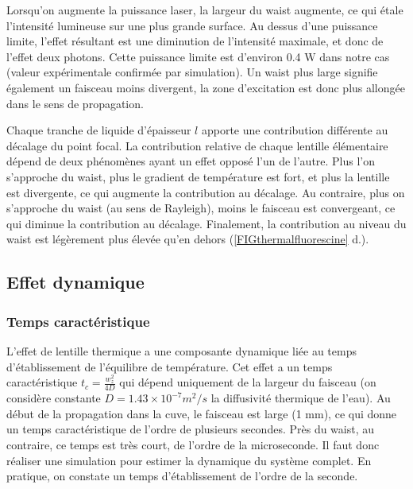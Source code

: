 Lorsqu'on augmente la puissance laser, la largeur du waist augmente, ce qui étale l'intensité lumineuse sur une plus grande surface. Au dessus d'une puissance limite, l'effet résultant est une diminution de l'intensité maximale, et donc de l'effet deux photons. Cette puissance limite est d'environ 0.4 W dans notre cas (valeur expérimentale confirmée par simulation). Un waist plus large signifie également un faisceau moins divergent, la zone d'excitation est donc plus allongée dans le sens de propagation.

Chaque tranche de liquide d'épaisseur $l$ apporte une contribution différente au décalage du point focal. La contribution relative de chaque lentille élémentaire dépend de deux phénomènes ayant un effet opposé l'un de l'autre. Plus l'on s'approche du waist, plus le gradient de température est fort, et plus la lentille est divergente, ce qui augmente la contribution au décalage. Au contraire, plus on s'approche du waist (au sens de Rayleigh), moins le faisceau est convergeant, ce qui diminue la contribution au décalage. Finalement, la contribution au niveau du waist est légèrement plus élevée qu'en dehors (\ref{FIGthermalfluorescine} d.).


\subsection{Effet dynamique}

\subsubsection{Temps caractéristique}

L'effet de lentille thermique a une composante dynamique liée au temps d'établissement de l'équilibre de température. Cet effet a un temps caractéristique $t_c = \frac{w_z^2}{4D}$ qui dépend uniquement de la largeur du faisceau (on considère constante $D = 1.43\times 10^{-7} m^2/s$ la diffusivité thermique de l'eau). Au début de la propagation dans la cuve, le faisceau est large (1 mm), ce qui donne un temps caractéristique de l'ordre de plusieurs secondes. Près du waist, au contraire, ce temps est très court, de l'ordre de la microseconde. Il faut donc réaliser une simulation pour estimer la dynamique du système complet. 
En pratique, on constate un temps d'établissement de l'ordre de la seconde.

